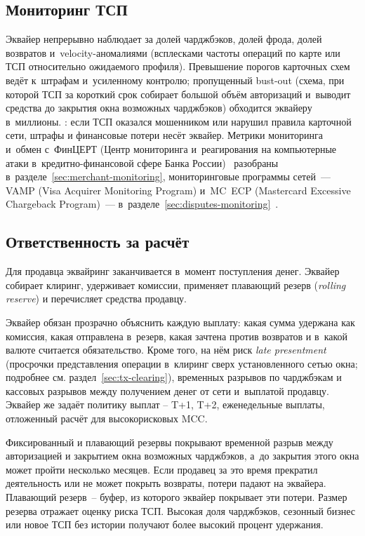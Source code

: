 \subsection*{Мониторинг ТСП}

Эквайер непрерывно наблюдает за долей чарджбэков, долей фрода,
долей возвратов и~velocity-аномалиями (всплесками частоты операций
по карте или ТСП относительно ожидаемого профиля). Превышение порогов
карточных схем ведёт к~штрафам и~усиленному контролю; пропущенный
bust-out (схема, при которой ТСП за короткий срок собирает большой
объём авторизаций и~выводит средства до закрытия окна возможных
чарджбэков) обходится эквайеру в~миллионы. : если ТСП оказался мошенником или нарушил правила
карточной сети, штрафы и финансовые потери несёт эквайер. Метрики
мониторинга и~обмен с~ФинЦЕРТ (Центр мониторинга и~реагирования на
компьютерные атаки в~кредитно-финансовой сфере Банка
России)~\cite{cbr-fincert-fraud-overview} разобраны
в~разделе~\ref{sec:merchant-monitoring}, мониторинговые программы
сетей~--- VAMP (Visa Acquirer Monitoring Program) и~MC~ECP
(Mastercard Excessive Chargeback Program)~--- в~разделе~\ref{sec:disputes-monitoring}~\cite{visa-vamp-intro,mc-tpr}.

\subsection*{Ответственность за расчёт}

Для продавца эквайринг заканчивается в~момент поступления денег.
Эквайер собирает клиринг, удерживает комиссии, применяет
плавающий резерв (\textit{rolling reserve}) и перечисляет средства продавцу.

Эквайер обязан прозрачно объяснить каждую выплату: какая сумма
удержана как комиссия, какая отправлена в~резерв, какая зачтена
против возвратов и в~какой валюте считается обязательство. Кроме
того, на нём риск \textit{late presentment} (просрочки представления
операции в~клиринг сверх установленного сетью окна; подробнее см.
раздел~\ref{sec:tx-clearing}), временных разрывов по чарджбэкам
и кассовых разрывов между получением денег от сети и~выплатой
продавцу. Эквайер же задаёт политику выплат -- T+1, T+2, еженедельные
выплаты, отложенный расчёт для высокорисковых MCC.

Фиксированный и плавающий резервы покрывают временной разрыв между
авторизацией и закрытием окна возможных чарджбэков, а~до закрытия
этого окна может пройти несколько месяцев. Если продавец за это
время прекратил деятельность или не может покрыть возвраты, потери
падают на эквайера. Плавающий резерв~-- буфер, из которого эквайер
покрывает эти потери. Размер резерва отражает оценку риска ТСП.
Высокая доля чарджбэков, сезонный бизнес или новое ТСП без истории
получают более высокий процент удержания.

